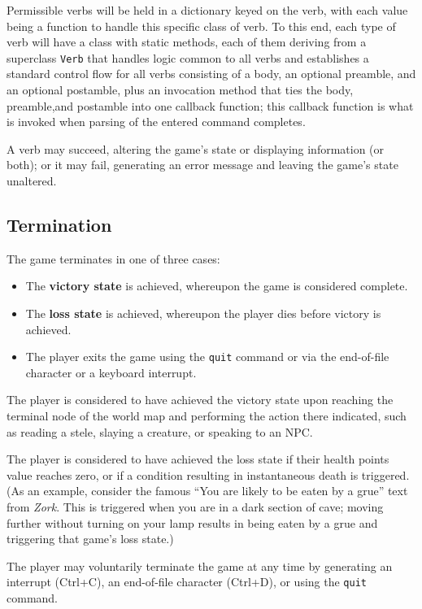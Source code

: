 \documentclass[11pt,letterpaper]{article}
\begin{document}
Permissible verbs will be held in a dictionary keyed on the verb, with each value being a function to handle this specific class of verb.  To this end, each type of verb will have a class with static methods, each of them deriving from a superclass \verb!Verb! that handles logic common to all verbs and establishes a standard control flow for all verbs consisting of a body, an optional preamble, and an optional postamble, plus an invocation method that ties the body, preamble,and postamble into one callback function; this callback function is what is invoked when parsing of the entered command completes.

A verb may succeed, altering the game's state or displaying information (or both); or it may fail, generating an error message and leaving the game's state unaltered.

\subsection{Termination}

The game terminates in one of three cases:

\begin{itemize}
    \item The {\bf victory state} is achieved, whereupon the game is considered complete.
    \item The {\bf loss state} is achieved, whereupon the player dies before victory is achieved.
    \item The player exits the game using the \verb!quit! command or via the end-of-file character or a keyboard interrupt.
\end{itemize}

The player is considered to have achieved the victory state upon reaching the terminal node of the world map and performing the action there indicated, such as reading a stele, slaying a creature, or speaking to an NPC.

The player is considered to have achieved the loss state if their health points value reaches zero, or if a condition resulting in instantaneous death is triggered.  (As an example, consider the famous ``You are likely to be eaten by a grue'' text from {\it Zork}.  This is triggered when you are in a dark section of cave; moving further without turning on your lamp results in being eaten by a grue and triggering that game's loss state.)

The player may voluntarily terminate the game at any time by generating an interrupt (Ctrl+C), an end-of-file character (Ctrl+D), or using the \verb!quit! command.
\end{document}
